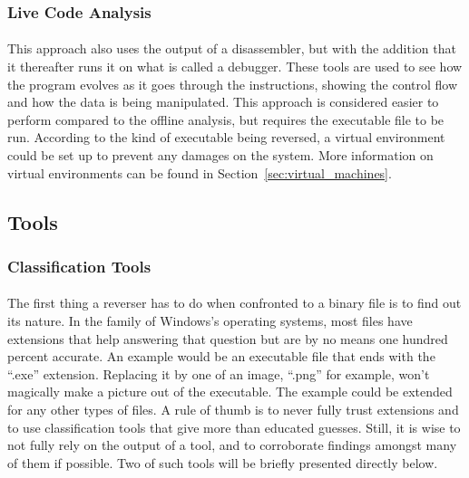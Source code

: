 \subsubsection{Live Code Analysis}
\paragraph{}
This approach also uses the output of a disassembler, but with the addition that it thereafter runs it on what is called a debugger. These tools are used to see how the program evolves as it goes through the instructions, showing the control flow and how the data is being manipulated. This approach is considered easier to perform compared to the offline analysis, but requires the executable file to be run. According to the kind of executable being reversed, a virtual environment could be set up to prevent any damages on the system. More information on virtual environments can be found in Section~\ref{sec:virtual_machines}.

\subsection{Tools}

\subsubsection{Classification Tools} \label{sec:classification_tools}
\paragraph{}
The first thing a reverser has to do when confronted to a binary file is to find out its nature. In the family of Windows's operating systems, most files have extensions that help answering that question but are by no means one hundred percent accurate. An example would be an executable file that ends with the “.exe” extension. Replacing it by one of an image, “.png” for example, won't magically make a picture out of the executable. The example could be extended for any other types of files. A rule of thumb is to never fully trust extensions and to use classification tools that give more than educated guesses. Still, it is wise to not fully rely on the output of a tool, and to corroborate findings amongst many of them if possible. Two of such tools will be briefly presented directly below.

